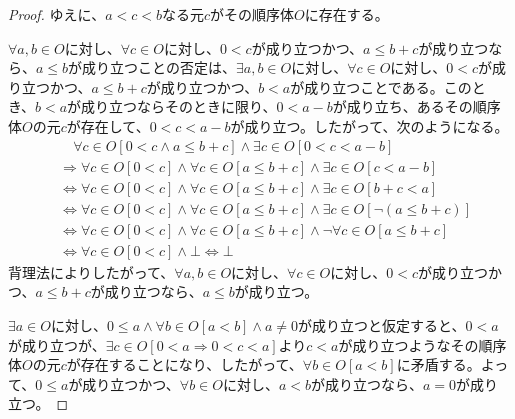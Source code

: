 \documentclass[dvipdfmx]{jsarticle}
\begin{document}
\begin{proof}
ゆえに、$a < c < b$なる元$c$がその順序体$O$に存在する。\par
$\forall a,b \in O$に対し、$\forall c \in O$に対し、$0 < c$が成り立つかつ、$a \leq b + c$が成り立つなら、$a \leq b$が成り立つことの否定は、$\exists a,b \in O$に対し、$\forall c \in O$に対し、$0 < c$が成り立つかつ、$a \leq b + c$が成り立つかつ、$b < a$が成り立つことである。このとき、$b < a$が成り立つならそのときに限り、$0 < a - b$が成り立ち、あるその順序体$O$の元$c$が存在して、$0 < c < a - b$が成り立つ。したがって、次のようになる。
\begin{align*}
&\quad \forall c \in O[ 0 < c \land a \leq b + c] \land \exists c \in O[ 0 < c < a - b]\\ 
&\Rightarrow \forall c \in O[ 0 < c] \land \forall c \in O[ a \leq b + c] \land \exists c \in O[ c < a - b]\\ 
&\Leftrightarrow \forall c \in O[ 0 < c] \land \forall c \in O[ a \leq b + c] \land \exists c \in O[ b + c < a]\\ 
&\Leftrightarrow \forall c \in O[ 0 < c] \land \forall c \in O[ a \leq b + c] \land \exists c \in O\left[ \neg(a \leq b + c) \right]\\ 
&\Leftrightarrow \forall c \in O[ 0 < c] \land \forall c \in O[ a \leq b + c] \land \neg\forall c \in O[ a \leq b + c]\\ 
&\Leftrightarrow \forall c \in O[ 0 < c] \land \bot \Leftrightarrow \bot
\end{align*}
背理法によりしたがって、$\forall a,b \in O$に対し、$\forall c \in O$に対し、$0 < c$が成り立つかつ、$a \leq b + c$が成り立つなら、$a \leq b$が成り立つ。\par
$\exists a \in O$に対し、$0 \leq a \land \forall b \in O[ a < b] \land a \neq 0$が成り立つと仮定すると、$0 < a$が成り立つが、$\exists c \in O[ 0 < a \Rightarrow 0 < c < a]$より$c < a$が成り立つようなその順序体$O$の元$c$が存在することになり、したがって、$\forall b \in O[ a < b]$に矛盾する。よって、$0 \leq a$が成り立つかつ、$\forall b \in O$に対し、$a < b$が成り立つなら、$a = 0$が成り立つ。
\end{proof}
\end{document}

